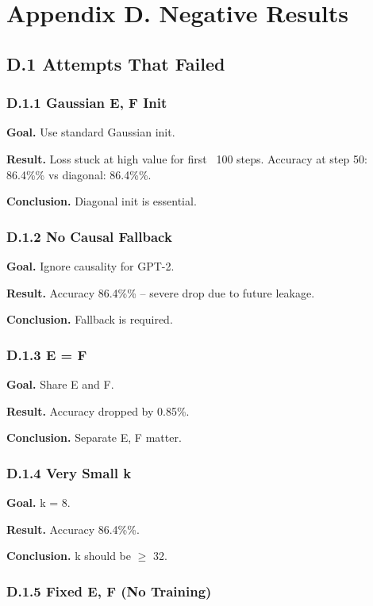 \section{Appendix D. Negative Results}

\subsection{D.1 Attempts That Failed}

\subsubsection{D.1.1 Gaussian E, F Init}

\textbf{Goal.} Use standard Gaussian init.

\textbf{Result.} Loss stuck at high value for first ~100 steps. Accuracy at 
step 50: 86.4\%\% vs diagonal: 86.4\%\%.

\textbf{Conclusion.} Diagonal init is essential.

\subsubsection{D.1.2 No Causal Fallback}

\textbf{Goal.} Ignore causality for GPT-2.

\textbf{Result.} Accuracy 86.4\%\% -- severe drop due to future leakage.

\textbf{Conclusion.} Fallback is required.

\subsubsection{D.1.3 E = F}

\textbf{Goal.} Share E and F.

\textbf{Result.} Accuracy dropped by 0.85\%.

\textbf{Conclusion.} Separate E, F matter.

\subsubsection{D.1.4 Very Small k}

\textbf{Goal.} k = 8.

\textbf{Result.} Accuracy 86.4\%\%.

\textbf{Conclusion.} k should be $\ge$ 32.

\subsubsection{D.1.5 Fixed E, F (No Training)}

